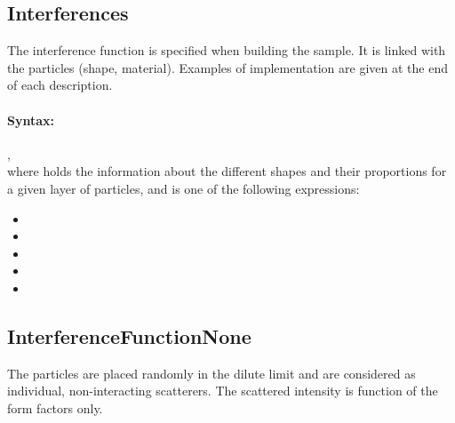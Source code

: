 \subsection{Interferences}

The interference function is specified when building the sample. It is linked with the particles (shape, material). Examples of implementation are given at the end of each description.

\paragraph{Syntax:}
 ,\\ where  holds the information about the different shapes and their proportions for a given layer of particles, and   is one of the following expressions:
\begin{itemize}
\item {}
\item {}
\item {}
\item {}
\item {}
\end{itemize}


\newpage
\subsection{InterferenceFunctionNone} 

The particles are placed randomly in the dilute limit and are considered as individual, non-interacting scatterers. The scattered intensity is function of the form factors only. 

